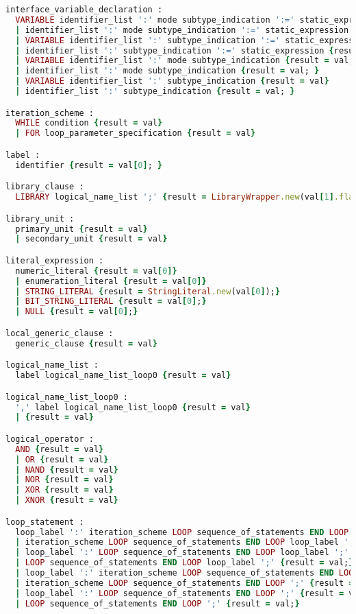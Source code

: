 \begin{lstlisting}[language=Ruby, style=rubystyle]
interface_variable_declaration :
  VARIABLE identifier_list ':' mode subtype_indication ':=' static_expression {result = val}
  | identifier_list ':' mode subtype_indication ':=' static_expression {result = val; }
  | VARIABLE identifier_list ':' subtype_indication ':=' static_expression {result = val; }
  | identifier_list ':' subtype_indication ':=' static_expression {result = val; }
  | VARIABLE identifier_list ':' mode subtype_indication {result = val; }
  | identifier_list ':' mode subtype_indication {result = val; }
  | VARIABLE identifier_list ':' subtype_indication {result = val}
  | identifier_list ':' subtype_indication {result = val; }

iteration_scheme :
  WHILE condition {result = val}
  | FOR loop_parameter_specification {result = val}

label :
  identifier {result = val[0]; }

library_clause :
  LIBRARY logical_name_list ';' {result = LibraryWrapper.new(val[1].flatten);}

library_unit :
  primary_unit {result = val}
  | secondary_unit {result = val}

literal_expression :
  numeric_literal {result = val[0]}
  | enumeration_literal {result = val[0]}
  | STRING_LITERAL {result = StringLiteral.new(val[0]);}
  | BIT_STRING_LITERAL {result = val[0];}
  | NULL {result = val[0];}

local_generic_clause :
  generic_clause {result = val}

logical_name_list :
  label logical_name_list_loop0 {result = val}

logical_name_list_loop0 :
  ',' label logical_name_list_loop0 {result = val}
  | {result = val}

logical_operator :
  AND {result = val}
  | OR {result = val}
  | NAND {result = val}
  | NOR {result = val}
  | XOR {result = val}
  | XNOR {result = val}

loop_statement :
  loop_label ':' iteration_scheme LOOP sequence_of_statements END LOOP loop_label ';' {result = val;}
  | iteration_scheme LOOP sequence_of_statements END LOOP loop_label ';' {result = val;}
  | loop_label ':' LOOP sequence_of_statements END LOOP loop_label ';' {result = val;}
  | LOOP sequence_of_statements END LOOP loop_label ';' {result = val;}
  | loop_label ':' iteration_scheme LOOP sequence_of_statements END LOOP ';' {result = val;}
  | iteration_scheme LOOP sequence_of_statements END LOOP ';' {result = val;}
  | loop_label ':' LOOP sequence_of_statements END LOOP ';' {result = val;}
  | LOOP sequence_of_statements END LOOP ';' {result = val;}


\end{lstlisting}
